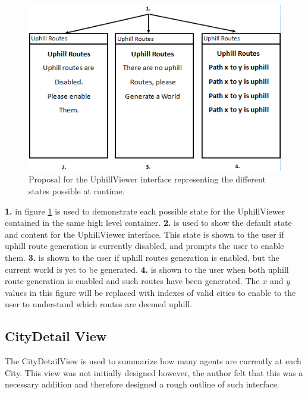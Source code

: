 \begin{figure}[H]
\centering
\includegraphics[scale=0.7]{Images/chapter4/uphilviews}
\caption[UphillViewer Design]{Proposal for the UphillViewer interface representing the different states possible at runtime.}
\label{fig:uphillViewImp}
\end{figure}

\textbf{1.} in figure \ref{fig:uphillViewImp} is used to demonstrate each possible state for the UphillViewer contained in the same high level container. \textbf{2.} is used to show the default state and content for the UphillViewer interface. This state is shown to the user if uphill route generation is currently disabled, and prompts the user to enable them. \textbf{3.} is shown to the user if uphill routes generation is enabled, but the current world is yet to be generated. \textbf{4.} is shown to the user when both uphill route generation is enabled and such routes have been generated. The $x$ and $y$ values in this figure will be replaced with indexes of valid cities to enable to the user to understand which routes are deemed uphill.

\subsection{CityDetail View}
\label{deetzlview}

The CityDetailView is used to summarize how many agents are currently at each City. This view was not initially designed however, the author felt that this was a necessary addition and therefore designed a rough outline of such interface.

